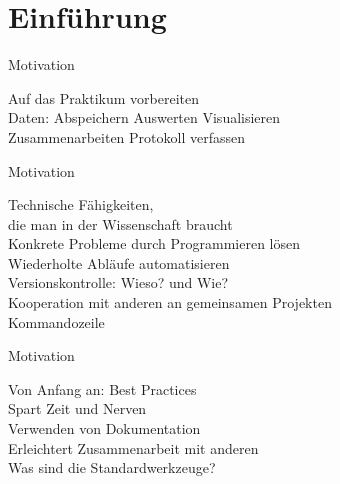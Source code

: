 \section{Einführung}


\begin{frame}{Motivation}
  \begin{center}
    \textcolor{vertexDarkRed}{\Huge Auf das Praktikum vorbereiten} \\[\baselineskip]
    \Large Daten:\hspace{2em} Abspeichern \hspace{2em} Auswerten \hspace{2em} Visualisieren \\ [\baselineskip]
    Zusammenarbeiten \hspace{2em} Protokoll verfassen\\
  \end{center}
\end{frame}

\begin{frame}{Motivation}
  \begin{center}
    \textcolor{vertexDarkRed}{\Huge Technische Fähigkeiten,\\ die man in der Wissenschaft braucht} \\[\baselineskip]
    \Large%
    Konkrete Probleme durch Programmieren lösen\\[\baselineskip]
    Wiederholte Abläufe automatisieren\\[\baselineskip]
    Versionskontrolle: Wieso? und Wie?\\[\baselineskip]
    Kooperation mit anderen an gemeinsamen Projekten\\[\baselineskip]
    Kommandozeile
  \end{center}
\end{frame}

\begin{frame}{Motivation}
  \begin{center}
    \textcolor{vertexDarkRed}{\Huge Von Anfang an: Best Practices} \\[\baselineskip]
    \Large%
    Spart Zeit und Nerven\\[\baselineskip]
    Verwenden von Dokumentation\\[\baselineskip]
    Erleichtert Zusammenarbeit mit anderen\\[\baselineskip]
    Was sind die Standardwerkzeuge?
  \end{center}
\end{frame}


